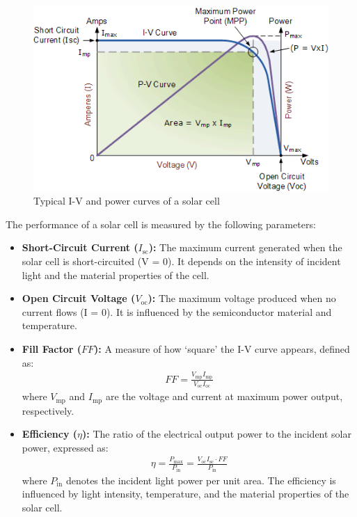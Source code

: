 \begin{figure}
    \centering
    \includegraphics[width=1\columnwidth]{images/curve.png}
    \caption{Typical I-V and power curves of a solar cell}
\end{figure}

The performance of a solar cell is measured by the following parameters:\\

\begin{itemize}
    \item \textbf{Short-Circuit Current ($I_\text{sc}$):} The maximum current generated when the solar cell is short-circuited
    (V = 0). It depends on the intensity of incident
    light and the material properties of the cell.
    \item \textbf{Open Circuit Voltage ($V_\text{oc}$):} The maximum voltage produced when no current flows (I = 0). It is
    influenced by the semiconductor material and temperature.
    \item \textbf{Fill Factor ($FF$):} A measure of how `square' the
    I-V curve appears, defined as:
    \begin{align}
        FF = \frac{V_\text{mp}I_\text{mp}}{V_\text{oc}I_\text{oc}}
    \end{align}
    where $V_\text{mp}$ and $I_\text{mp}$ are the voltage and current at maximum power output, respectively.
    \item \textbf{Efficiency ($\eta$):} The ratio of the electrical output
    power to the incident solar power, expressed as:
    \begin{align}
        \eta = \frac{P_\text{max}}{P_\text{in}} = \frac{V_\text{oc} I_\text{sc} \cdot FF}{P_\text{in}}
    \end{align}
    where $P_\text{in}$ denotes the incident light power per unit
area. The efficiency is influenced by light intensity,
temperature, and the material properties of the solar cell.
    
\end{itemize}
